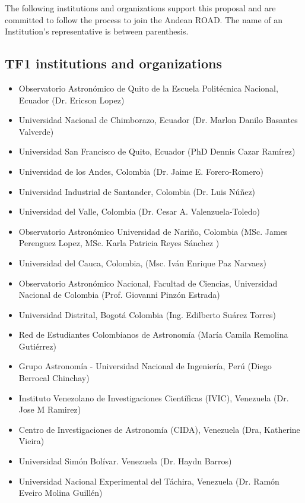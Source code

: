 \documentclass[12pt]{article}
\begin{document}
The following institutions and organizations support this proposal and
are committed to follow the process to join the Andean ROAD. The name
of an Institution’s representative is between parenthesis. 

\subsection*{TF1 institutions and organizations}
\begin{itemize}
\item Observatorio Astronómico de Quito de la Escuela Politécnica
  Nacional, Ecuador (Dr. Ericson Lopez) 
\item Universidad Nacional de Chimborazo, Ecuador (Dr. Marlon Danilo
  Basantes Valverde) 
\item Universidad San Francisco de Quito, Ecuador (PhD Dennis Cazar
  Ramírez) 
\item Universidad de los Andes, Colombia (Dr. Jaime E. Forero-Romero) 
\item Universidad Industrial de Santander, Colombia (Dr. Luis Núñez)
\item Universidad del Valle, Colombia (Dr. Cesar A. Valenzuela-Toledo)
\item Observatorio Astronómico Universidad de Nariño, Colombia
  (MSc. James Perenguez Lopez, MSc. Karla Patricia Reyes Sánchez ) 
\item Universidad del Cauca, Colombia, (Msc. Iván Enrique Paz Narvaez) 
\item Observatorio Astronómico Nacional, Facultad de Ciencias,
  Universidad Nacional de Colombia (Prof. Giovanni Pinzón Estrada) 
\item Universidad Distrital, Bogotá Colombia (Ing. Edilberto Suárez
  Torres) 
\item Red de Estudiantes Colombianos de Astronom\'ia (Mar\'ia Camila
  Remolina Guti\'errez) 
\item Grupo Astronomía - Universidad Nacional de Ingeniería, Perú
  (Diego Berrocal Chinchay) 
\item Instituto Venezolano de Investigaciones Científicas (IVIC),
  Venezuela (Dr. Jose M Ramirez) 
\item Centro de Investigaciones de Astronomía (CIDA), Venezuela (Dra,
  Katherine Vieira) 
\item Universidad Simón Bolívar. Venezuela (Dr. Haydn Barros) 
\item Universidad Nacional Experimental del Táchira, Venezuela
  (Dr. Ramón Eveiro Molina Guillén) 
\end{itemize}
\end{document}
